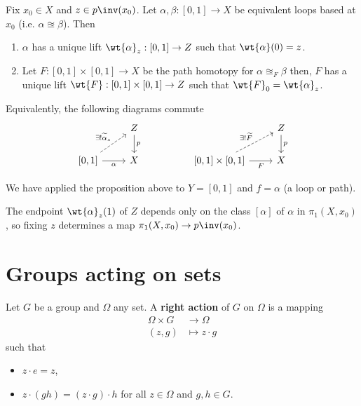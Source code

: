 \documentclass[12pt, a4paper]{article}
\begin{document}
\begin{mdthm}
    Fix \(x_0 \in X\) and \(z \in p\inv(x_0)\). Let \(\alpha,\beta :[0,1] \to X\) be equivalent loops based at \(x_0\) (i.e. \(\alpha \approxeq \beta\)). Then
    \begin{enumerate}
        \item \(\alpha\) has a unique lift \(\wt{\alpha}_z :[0,1]\to Z\) such that \(\wt{\alpha}(0)=z\).
        \item Let \(F : [0,1] \times [0,1] \to X\) be the path homotopy for \(\alpha\approxeq_F \beta\) then, \(F\) has a unique lift \(\wt{F}:[0,1]\times[0,1] \to Z\) such that \(\wt{F}_0 = \wt{\alpha}_z\).
    \end{enumerate}
    Equivalently, the following diagrams commute 
    \[\begin{tikzcd}
        & Z &&& Z \\
        {[0,1]} & X && {[0,1]\times[0,1]} & X
        \arrow["\alpha"', from=2-1, to=2-2]
        \arrow["{\exists!\widetilde{\alpha}_z}", dashed, from=2-1, to=1-2]
        \arrow["p", from=1-2, to=2-2]
        \arrow["F"', from=2-4, to=2-5]
        \arrow["{\exists!\widetilde{F}}", dashed, from=2-4, to=1-5]
        \arrow["p", from=1-5, to=2-5]
    \end{tikzcd}\]
\end{mdthm}

\begin{mdnote}
    We have applied the proposition above to \(Y=[0,1]\) and \(f=\alpha\) (a loop or path).
\end{mdnote}


\begin{corollary}
    The endpoint \(\wt{\alpha}_z(1)\) of \(Z\) depends only on the class \([\alpha]\) of \(\alpha\) in \(\pi_1(X,x_0)\), so fixing \(z\) determines a map \(\pi_1(X,x_0)\to p\inv(x_0)\).
\end{corollary}

\section{Groups acting on sets}

\begin{definition}
    Let \(G\) be a group and \(\Omega\) any set. A \textbf{right action} of \(G\) on \(\Omega\) is a mapping 
    \[\begin{aligned}
        \Omega \times G &\to \Omega \\
        (z,g) &\mapsto z\cdot g
    \end{aligned}\]
    such that 
    \begin{itemize}
        \item \(z\cdot e =z\),
        \item \(z\cdot (gh)= (z\cdot g) \cdot h\) for all \(z\in \Omega\) and \(g,h \in G\).
    \end{itemize}
\end{definition}
\end{document}
